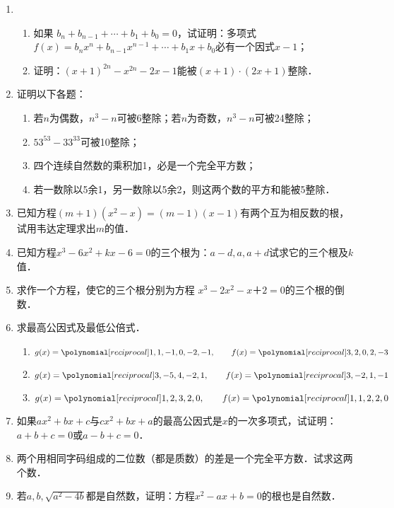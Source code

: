 \begin{enumerate}
\item 
\begin{enumerate}
\item 如果 $b_n+b_{n-1}+\cdots+b_1+b_0=0$，试证明：多项式$f(x)=b_nx^n+b_{n-1}x^{n-1}+\cdots+b_1x+b_0$必有一个因式$x-1$；
\item 证明：$(x+1)^{2n}-x^{2n}-2x-1$能被$(x+1)\cdot (2x+1)$整除．
\end{enumerate}

\item 证明以下各题：
\begin{enumerate}
    \item 若$n$为偶数，$n^3-n$可被6整除；若$n$为奇数，$n^3-n$可被24整除；
    \item $53^{53}-33^{33}$可被10整除；
    \item 四个连续自然数的乘积加1，必是一个完全平方数；
    \item 若一数除以5余1，另一数除以5余2，则这两个数的平方和能被5整除．
\end{enumerate}

\item 已知方程$(m+1)(x^2-x)=(m-1)(x-1)$有两个互为相反数的根，试用韦达定理求出$m$的值．
\item 已知方程$x^3-6x^2+kx-6=0$的三个根为：$a-d,a,a+d$试求它的三个根及$k$值．
\item 求作一个方程，使它的三个根分别为方程 $x^3-2x^2-x＋2=0$的三个根的倒数．

\item 求最高公因式及最低公倍式．
\begin{enumerate}
    \item $g(x)=\poly{1,1,-1,0,-2,-1},\qquad f(x)=\poly{3,2,0,2,-3}$
    \item $g(x)=\poly{3,-5,4,-2,1},\qquad f(x)=\poly{3,-2,1,-1}$
    \item $g(x)=\poly{1,2,3,2,0},\qquad f(x)=\poly{1,1,2,2,0}$
\end{enumerate}


\item 如果$ax^2+bx+c$与$cx^2+bx+a$的最高公因式是$x$的一次多项式，试证明：
$a+b+c=0$或$a-b+c=0$．
\item 两个用相同字码组成的二位数（都是质数）的差是一个完全平方数．试求这两个数．
\item 若$a,b,\sqrt{a^2-4b}$都是自然数，证明：方程$x^2-ax+b=0$的根也是自然数．

\end{enumerate}

